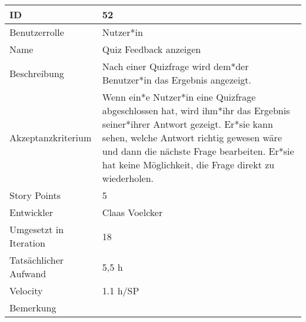 \begin{tabularx}{\textwidth}{|p{}|X|}
	\hline
	ID & 52\\
	\hline
	Benutzerrolle & Nutzer*in\\
	\hline
	Name & Quiz Feedback anzeigen\\
	\hline
	Beschreibung & Nach einer Quizfrage wird dem*der Benutzer*in das Ergebnis angezeigt.\\
	\hline
	Akzeptanzkriterium & Wenn ein*e Nutzer*in eine Quizfrage abgeschlossen hat, wird ihm*ihr das Ergebnis seiner*ihrer Antwort gezeigt. Er*sie kann sehen, welche Antwort richtig gewesen wäre und dann die nächste Frage bearbeiten. Er*sie hat keine Möglichkeit, die Frage direkt zu wiederholen. \\
	\hline
	Story Points & 5\\
	\hline
	Entwickler & Claas Voelcker\\
	\hline
	Umgesetzt in Iteration & 18\\
	\hline
	Tatsächlicher Aufwand & 5,5 h\\
	\hline
	Velocity & 1.1 h/SP\\
	\hline
	Bemerkung & \\
	\hline
\end{tabularx}
\vspace{20pt}
